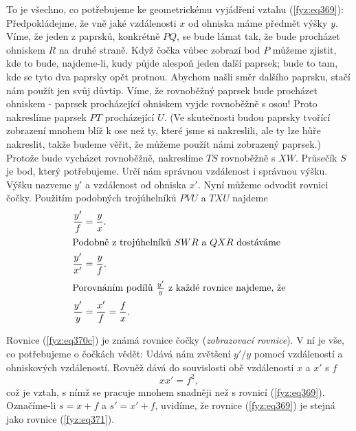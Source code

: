     To je všechno, co potřebujeme ke geometrickému vyjádření vztahu (\ref{fyz:eq369}): 
    Předpokládejme, že vně jaké vzdálenosti \(x\) od ohniska máme předmět výšky \(y\). Víme, že 
    jeden z paprsků, konkrétně \(PQ\), se bude lámat tak, že bude procházet ohniskem \(R\) na druhé 
    straně. Když čočka vůbec zobrazí bod \(P\) můžeme zjistit, kde to bude, najdeme-li, kudy půjde 
    alespoň jeden další paprsek; bude to tam, kde se tyto dva paprsky opět protnou. Abychom našli 
    směr dalšího paprsku, stačí nám použít jen svůj důvtip. Víme, že rovnoběžný paprsek bude 
    procházet ohniskem - paprsek procházející ohniskem vyjde rovnoběžně s osou! Proto nakreslíme 
    paprsek \(PT\) procházející \(U\). (Ve skutečnosti budou paprsky tvořící zobrazení mnohem blíž 
    k ose než ty, které jsme si nakreslili, ale ty lze hůře nakreslit, takže budeme věřit, že 
    můžeme použít námi zobrazený paprsek.) Protože bude vycházet rovnoběžně, nakreslíme \(TS\) 
    rovnoběžně s \(XW\). Průsečík \(S\) je bod, který potřebujeme. Určí nám správnou vzdálenost i 
    správnou výšku. Výšku nazveme \(y'\) a vzdálenost od ohniska \(x'\). Nyní můžeme odvodit 
    rovnici čočky. Použitím podobných trojúhelníků \(PVU\) a \(TXU\) najdeme
    \begin{subequations}\label{fyz:eq370}
      \begin{align}
       \frac{y'}{f}  &= \frac{y}{x}.                                     \label{fyz:eq370a}  \\
        \shortintertext{Podobně z trojúhelníků \(SWR\) a \(QXR\) dostáváme}
       \frac{y'}{x'} &= \frac{y}{f}.                                     \label{fyz:eq370b}  \\
        \shortintertext{Porovnáním podílů \(\frac{y'}{y}\) z každé rovnice najdeme, že}
        \frac{y'}{y} &= \frac{x'}{f} = \frac{f}{x}.                      \label{fyz:eq370c}
      \end{align}    
    \end{subequations}
    
    Rovnice (\ref{fyz:eq370c}) je známá rovnice čočky (\emph{zobrazovací rovnice}). V ní je vše, co 
    potřebujeme o čočkách vědět: Udává nám zvětšení \(y'/y\) pomocí vzdáleností a ohniskových 
    vzdáleností. Rovněž dává do souvislosti obě vzdálenosti \(x\) a \(x'\) s \(f\)
    \begin{equation}  \label{fyz:eq371}
      xx' = f^2,
    \end{equation}
    což je vztah, s nímž se pracuje mnohem snadněji než s rovnicí (\ref{fyz:eq369}). Označíme-li 
    \(s = x + f\) a \(s' = x' + f\), uvidíme, že rovnice (\ref{fyz:eq369}) je stejná jako rovnice 
    (\ref{fyz:eq371}).
    
